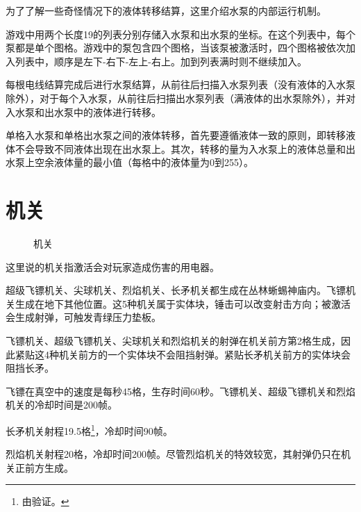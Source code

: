 为了了解一些奇怪情况下的液体转移结算，这里介绍水泵的内部运行机制。

游戏中用两个长度19的列表分别存储入水泵和出水泵的坐标。在这个列表中，每个泵都是单个图格。游戏中的泵包含四个图格，当该泵被激活时，四个图格被依次加入列表中，顺序是左下-右下-左上-右上。加到列表满时则不继续加入。

每根电线结算完成后进行水泵结算，从前往后扫描入水泵列表（没有液体的入水泵除外），对于每个入水泵，从前往后扫描出水泵列表（满液体的出水泵除外），并对入水泵和出水泵中的液体进行转移。

单格入水泵和单格出水泵之间的液体转移，首先要遵循液体一致的原则，即转移液体不会导致不同液体出现在出水泵上。其次，转移的量为入水泵上的液体总量和出水泵上空余液体量的最小值（每格中的液体量为0到255）。

\section{机关}
\begin{figure}[!ht]
\centering
{}\qquad
{}\qquad
{}\qquad
{}\qquad
{}\qquad
{}\qquad
{}\qquad
{}
\caption{机关}
\end{figure}
这里说的机关指激活会对玩家造成伤害的用电器。

超级飞镖机关、尖球机关、烈焰机关、长矛机关都生成在丛林蜥蜴神庙内。飞镖机关生成在地下其他位置。这5种机关属于实体块，锤击可以改变射击方向；被激活会生成射弹，可触发青绿压力垫板。

飞镖机关、超级飞镖机关、尖球机关和烈焰机关的射弹在机关前方第2格生成，因此紧贴这4种机关前方的一个实体块不会阻挡射弹。紧贴长矛机关前方的实体块会阻挡长矛。

飞镖在真空中的速度是每秒45格，生存时间60秒。飞镖机关、超级飞镖机关和烈焰机关的冷却时间是200帧。

长矛机关射程19.5格\footnote{由验证。}，冷却时间90帧。

烈焰机关射程20格，冷却时间200帧。尽管烈焰机关的特效较宽，其射弹仍只在机关正前方生成。

